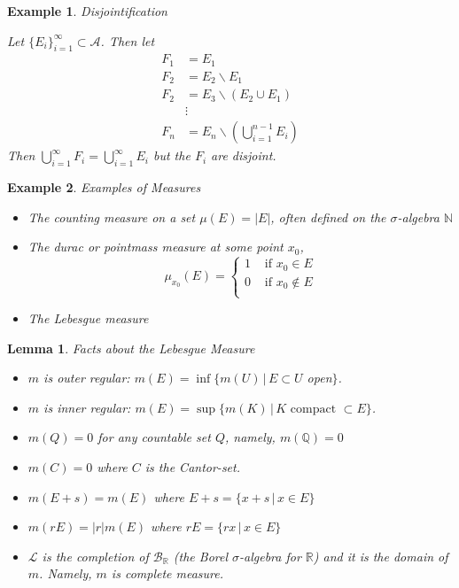 \documentclass[12pt]{Qual}
\newtheorem{example}{Example}
\newtheorem{lemma}{Lemma}
\begin{document}
\begin{example}{\Large\textit{Disjointification}}

Let $\{E_i\}_{i=1}^\infty\subset\mathscr{A}$. Then let \begin{align*}
    F_1&=E_1\\
    F_2&=E_2\backslash E_1\\
    F_2&=E_3\backslash (E_2\cup E_1)\\
    &\vdots\\
    F_n&=E_n\backslash\left(\bigcup_{i=1}^{n-1}E_i\right)
\end{align*} Then $\bigcup_{i=1}^\infty F_i=\bigcup_{i=1}^\infty E_i$ but the $F_i$ are disjoint.
\end{example}
\vspace{0.5cm}
\begin{example}{\Large\textit{Examples of Measures}}

\begin{itemize}
\renewcommand\labelitemi{\faBug}
    \item The counting measure on a set $\mu(E)=|E|$, often defined on the $\sigma$-algebra $\mathbb{N}$
    \item The durac or pointmass measure at some point $x_0$, $$\mu_{x_0}(E)=\begin{cases}
    1 & \text{ if }x_0 \in E\\
    0 & \text{ if }x_0\notin E\\
    \end{cases}$$
    \item The Lebesgue measure
\end{itemize}
\end{example}
\vspace{0.5cm}
\begin{lemma}{\Large\textit{Facts about the Lebesgue Measure}}

\begin{itemize}
\renewcommand\labelitemi{\faCoffee}
    \item $m$ is outer regular: $\displaystyle m(E)=\inf\{m(U)\,|\, E\subset U$ open$\}$.
    \item $m$ is inner regular: $\displaystyle m(E)=\sup\{m(K)\,|\, K\text{ compact }\subset E\}$.
    \item $m(Q)=0$ for any countable set $Q$, namely, $m(\mathbb{Q})=0$
    \item $m(C)=0$ where $C$ is the Cantor-set.
    \item $m(E+s)=m(E)$ where $E+s=\{x+s\,|\,x\in E\}$
    \item $m(rE)=|r|m(E)$ where $rE=\{rx\,|\,x\in E\}$
    \item $\mathscr{L}$ is the completion of $\mathscr{B}_\mathbb{R}$ (the Borel $\sigma$-algebra for $\mathbb{R}$) and it is the domain of $m$. Namely, $m$ is complete measure.
\end{itemize}

\end{lemma}
\end{document}
